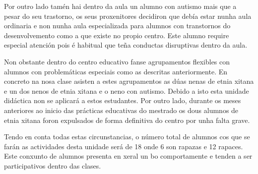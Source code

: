 Por outro lado tamén hai dentro da aula un alumno con autismo mais que a pesar do seu trastorno, os seus proxenitores decidiron que debía estar nunha aula ordinaria e non nunha aula especializada para alumnos con transtornos do desenvolvemento como a que existe no propio centro. Este alumno require especial atención pois é habitual que teña conductas disruptivas dentro da aula.

Non obstante dentro do centro educativo fanse agrupamentos flexibles con alumnos con problemáticas especiais como as descritas anteriormente. En concreto na nosa clase asisten a estes agrupamentos as dúas nenas de etnia xitana e un dos nenos de etnia xitana e o neno con autismo. Debido a isto esta unidade didáctica non se aplicará a estos estudantes. Por outro lado, durante os meses anteriores ao inicio das prácticas educativas do mestrado os dous alumnos de etnia xitana foron expulsados de forma definitiva do centro por unha falta grave.

Tendo en conta todas estas circunstancias, o número total de alumnos cos que se farán as actividades desta unidade será de 18 onde 6 son rapazas e 12 rapaces. Este conxunto de alumnos presenta en xeral un bo comportamente e tenden a ser participativos dentro das clases.
